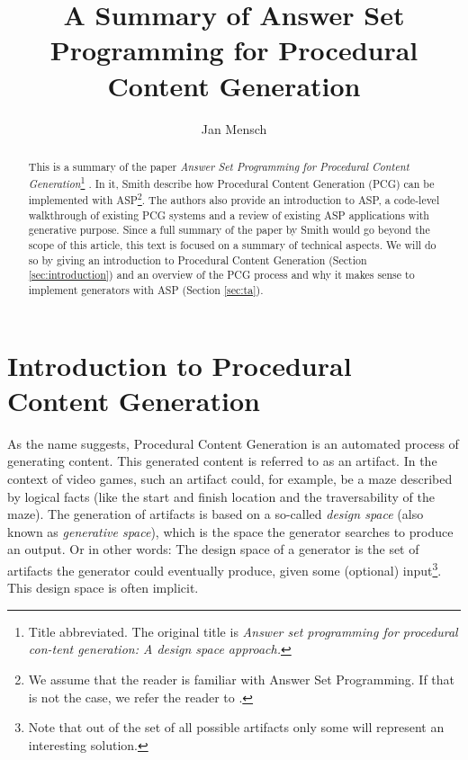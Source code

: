 \documentclass[runningheads]{llncs}
\newcommand{\papertitle}{Answer Set Programming for Procedural Content Generation}
\newcommand{\authorquote}{Smith \etal}
\begin{document}
\title{A Summary of \papertitle}

\author{Jan Mensch}




%
\maketitle              %


\begin{abstract}
This is a summary of the paper \textit{\papertitle}\footnote{Title abbreviated. The original title is \textit{Answer set programming for procedural con-tent generation: A design space approach.}} \cite{smith2011answer}. In it, \authorquote{} describe how Procedural Content Generation (PCG) can be implemented with ASP\footnote{We assume that the reader is familiar with Answer Set Programming. If that is not the case, we refer the reader to \cite{erdem2016applications}.}. The authors also provide an introduction to ASP, a code-level walkthrough of existing PCG systems and a review of existing ASP applications with generative purpose. Since a full summary of the paper by \authorquote{} would go beyond the scope of this article, this text is focused on a summary of technical aspects. We will do so by giving an introduction to Procedural Content Generation (Section \ref{sec:introduction}) and an overview of the PCG process and why it makes sense to implement generators with ASP (Section \ref{sec:ta}). 

\end{abstract}


\section{Introduction to Procedural Content Generation} \label{sec:introduction}

    As the name suggests, Procedural Content Generation is an automated process of generating content. This generated content is referred to as an artifact. In the context of video games, such an artifact could, for example, be a maze described by logical facts (like the start and finish location and the traversability of the maze). The generation of artifacts is based on a so-called \textit{design space} (also known as \textit{generative space}), which is the space the generator searches to produce an output. Or in other words: The design space of a generator is the set of artifacts the generator could eventually produce, given some (optional) input\footnote{Note that out of the set of all possible artifacts only some will represent an interesting solution.}. This design space is often implicit. 
    
\end{document}
